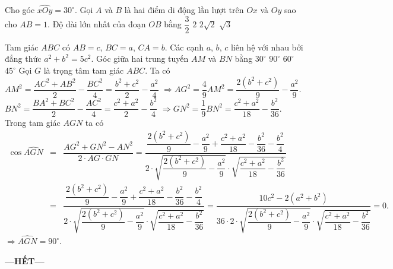 \begin{ex}%
	Cho góc $ \widehat{xOy}=30^\circ $. Gọi $ A$ và $ B$ là hai điểm di động lần lượt trên $ Ox$ và $ Oy$ sao cho $ AB=1$. Độ dài lớn nhất của đoạn $ OB$ bằng
	\choice
	{$ \dfrac{3}{2}$}
	{\True $ 2$}
	{$ 2\sqrt{2}$}
	{$ \sqrt{3}$}
\end{ex}


\begin{ex}%
	Tam giác $ ABC$ có $ AB=c$, $BC=a$, $CA=b$. Các cạnh $ a$, $b$, $c$ liên hệ với nhau bởi đẳng thức $ a^2+b^2=5c^2$. Góc giữa hai trung tuyến $ AM$ và $ BN$ bằng
	\choice
	{$ 30^\circ$}
	{\True $ 90^\circ$}
	{$ 60^\circ$}
	{$ 45^\circ$}
	\loigiai
	{Gọi $ G$ là trọng tâm tam giác $ABC$. Ta có\\
		$AM^2=\dfrac{AC^2+AB^2}{2}-\dfrac{BC^2}{4}=\dfrac{b^2+c^2}{2}-\dfrac{a^2}{4}$ $ \Rightarrow AG^2=\dfrac{4}{9}AM^2=\dfrac{2(b^2+c^2 )}{9}-\dfrac{a^2}{9}$. \\
		$BN^2=\dfrac{BA^2+BC^2}{2}-\dfrac{AC^2}{4}=\dfrac{c^2+a^2}{2}-\dfrac{b^2}{4}$ $ \Rightarrow GN^2=\dfrac{1}{9}BN^2=\dfrac{c^2+a^2}{18}-\dfrac{b^2}{36}$.\\
		Trong tam giác $AGN$ ta có
		\begin{eqnarray*}
			\cos \widehat{AGN}&=&\dfrac{AG^2+GN^2-AN^2}{2\cdot AG\cdot GN}
			=\dfrac{\dfrac{2(b^2+c^2 )}{9}-\dfrac{a^2}{9}+\dfrac{c^2+a^2}{18}-\dfrac{b^2}{36}-\dfrac{b^2}{4}}{2\cdot \sqrt{\dfrac{2(b^2+c^2 )}{9}-\dfrac{a^2}{9}}\cdot \sqrt{\dfrac{c^2+a^2}{18}-\dfrac{b^2}{36}}} \\
			&=&\dfrac{\dfrac{2(b^2+c^2 )}{9}-\dfrac{a^2}{9}+\dfrac{c^2+a^2}{18}-\dfrac{b^2}{36}-\dfrac{b^2}{4}}{2\cdot \sqrt{\dfrac{2(b^2+c^2 )}{9}-\dfrac{a^2}{9}}\cdot \sqrt{\dfrac{c^2+a^2}{18}-\dfrac{b^2}{36}}}  =\dfrac{10c^2-2(a^2+b^2 )}{36\cdot 2\cdot \sqrt{\dfrac{2(b^2+c^2 )}{9}-\dfrac{a^2}{9}}\cdot \sqrt{\dfrac{c^2+a^2}{18}-\dfrac{b^2}{36}}}=0.
		\end{eqnarray*}
		$ \Rightarrow \widehat{AGN}=90^\circ$.}
\end{ex}

\centerline{\textbf{---HẾT---}}
